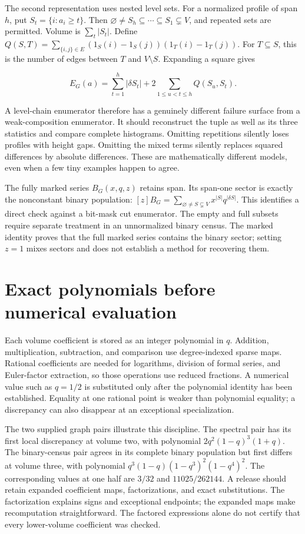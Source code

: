 \documentclass[
  11pt,
  a4paper,
]{report}
\begin{document}
The second representation uses nested level sets. For a normalized
profile of span \(h\), put \(S_t=\{i:a_i\ge t\}\). Then
\(\varnothing\ne S_h\subseteq\cdots\subseteq S_1\subsetneq V\), and
repeated sets are permitted. Volume is \(\sum_t|S_t|\). Define
\(Q(S,T)=\sum_{\{i,j\}\in E}(1_S(i)-1_S(j))(1_T(i)-1_T(j))\). For
\(T\subseteq S\), this is the number of edges between \(T\) and
\(V\setminus S\). Expanding a square gives

\[
E_G(a)=\sum_{t=1}^{h}|\delta S_t|+2\sum_{1\le u<t\le h}Q(S_u,S_t).
\]

A level-chain enumerator therefore has a genuinely different failure
surface from a weak-composition enumerator. It should reconstruct the
tuple as well as its three statistics and compare complete histograms.
Omitting repetitions silently loses profiles with height gaps. Omitting
the mixed terms silently replaces squared differences by absolute
differences. These are mathematically different models, even when a few
tiny examples happen to agree.

The fully marked series \(B_G(x,q,z)\) retains span. Its span-one sector
is exactly the nonconstant binary population:
\([z]B_G=\sum_{\varnothing\ne S\subsetneq V}x^{|S|}q^{|\delta S|}\).
This identifies a direct check against a bit-mask cut enumerator. The
empty and full subsets require separate treatment in an unnormalized
binary census. The marked identity proves that the full marked series
contains the binary sector; setting \(z=1\) mixes sectors and does not
establish a method for recovering them.

\hypertarget{exact-polynomials-before-numerical-evaluation}{%
\section{Exact polynomials before numerical
evaluation}\label{exact-polynomials-before-numerical-evaluation}}

Each volume coefficient is stored as an integer polynomial in \(q\).
Addition, multiplication, subtraction, and comparison use degree-indexed
sparse maps. Rational coefficients are needed for logarithms, division
of formal series, and Euler-factor extraction, so those operations use
reduced fractions. A numerical value such as \(q=1/2\) is substituted
only after the polynomial identity has been established. Equality at one
rational point is weaker than polynomial equality; a discrepancy can
also disappear at an exceptional specialization.

The two supplied graph pairs illustrate this discipline. The spectral
pair has its first local discrepancy at volume two, with polynomial
\(2q^2(1-q)^3(1+q)\). The binary-census pair agrees in its complete
binary population but first differs at volume three, with polynomial
\(q^3(1-q)(1-q^3)^2(1-q^4)^2\). The corresponding values at one half are
\(3/32\) and \(11025/262144\). A release should retain expanded
coefficient maps, factorizations, and exact substitutions. The
factorization explains signs and exceptional endpoints; the expanded
maps make recomputation straightforward. The factored expressions alone
do not certify that every lower-volume coefficient was checked.
\end{document}
